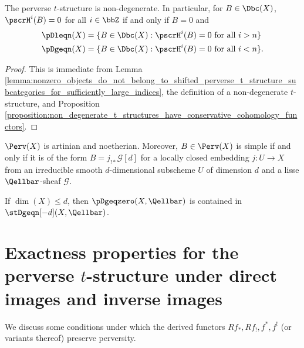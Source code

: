 



\begin{corollary}
    \TODO{}
The perverse $t$-structure is non-degenerate. In particular, for $B \in \Dbc(X)$, $\pscrH^i(B) = 0$ for all $i \in \bbZ$ if and only if $B = 0$ and 
\begin{align*}
    \pDleqn(X) &= \{B \in \Dbc(X) : \pscrH^i(B) = 0 \text{ for all } i > n \} \\
    \pDgeqn(X) &= \{B \in \Dbc(X) : \pscrH^i(B) = 0 \text{ for all } i < n \}.
\end{align*}
\end{corollary}
\begin{proof}
    This is immediate from Lemma \ref{lemma:nonzero_objects_do_not_belong_to_shifted_perverse_t_structure_subcategories_for_sufficiently_large_indices}, the definition of a non-degenerate $t$-structure, and Proposition \ref{proposition:non_degenerate_t_structures_have_conservative_cohomology_functors}.
\end{proof}

\begin{theorem}
    \TODO{}
    $\Perv(X)$ is artinian and noetherian. Moreover, $B \in \Perv(X)$ is simple if and only if it is of the form $B = j_{!*} \mathscr{G}[d]$ for a locally closed embedding $j: U \to X$ from an irreducible smooth $d$-dimensional subscheme $U$ of dimension $d$ and a lisse $\Qellbar$-sheaf $\mathscr{G}$.
\end{theorem}

\begin{proposition}
    If $\dim(X) \leq d$, then $\pDgeqzero(X, \Qellbar)$ is contained in $\stDgeqn[-d](X, \Qellbar)$.
\end{proposition}

\section{Exactness properties for the perverse \texorpdfstring{$t$}{t}-structure under direct images and inverse images}

We discuss some conditions under which the derived functors $Rf_*, Rf_!, f^*, f^!$ (or variants thereof) preserve perversity.

